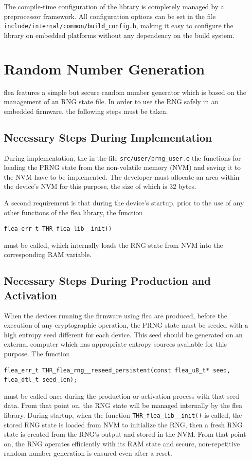 \documentclass[a4paper,11pt]{scrartcl}
\begin{document}
  The compile-time configuration of the library is completely managed by a
  preprocessor framework. All configuration options can be set in the file
  \verb#include/internal/common/build_config.h#, making it easy to configure the
  library on embedded platforms without any dependency on the build system.

\section{Random Number Generation }
\label{secRng}

flea features a simple but secure random number generator which is based on
the management of an RNG state file. In order to use the RNG safely in an
embedded firmware, the following steps must be taken. 

\subsection{Necessary Steps During Implementation}
During implementation, the in the file \verb#src/user/prng_user.c# the functions
for loading the PRNG state from the non-volatile memory (NVM)  and saving it to the NVM have to be
implemented. The developer must allocate an area within the device's NVM for
this purpose, the size of which is 32 bytes.

A second requirement is that during the device's startup, prior to the use of any
other functions of the flea library, the function 
\begin{verbatim}
flea_err_t THR_flea_lib__init()
\end{verbatim}
must be called, which internally loads the RNG state from NVM into the
corresponding RAM variable.


\subsection{Necessary Steps During Production and Activation}
When the devices running the firmware using flea are produced, before the
execution of any cryptographic operation, the PRNG state must be seeded with a
high entropy seed different for each device. This seed should be generated on an
external computer which has appropriate entropy sources available for this
purpose. The function 
\begin{verbatim}
flea_err_t THR_flea_rng__reseed_persistent(const flea_u8_t* seed, flea_dtl_t seed_len);
\end{verbatim}
must be called once during the production or activation process with that seed data.
From that point on, the RNG state will be managed internally by the flea
library. During startup, when the function \verb#THR_flea_lib__init()# is
called, the stored RNG state is loaded from NVM to initialize the RNG, then a
fresh RNG state is created from the RNG's output and stored in the NVM. From
that point on, the RNG operates efficiently with its RAM state and secure,
non-repetitive random number generation is ensured even after a reset. 
\end{document}
